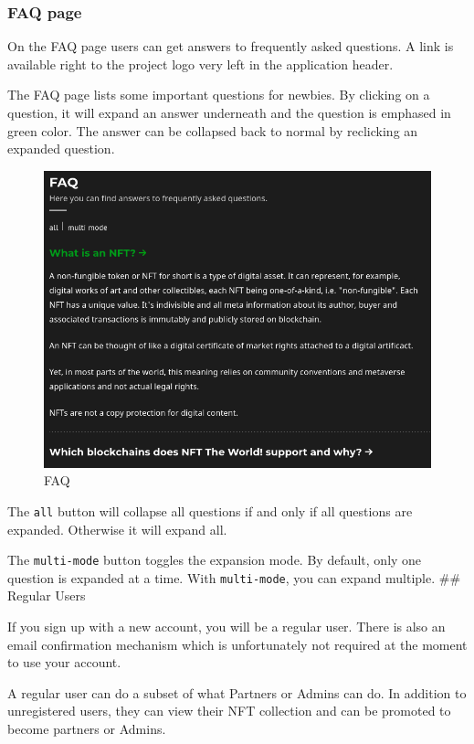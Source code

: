 \documentclass[
]{article}
\begin{document}
\hypertarget{faq-page}{%
\subsubsection{FAQ page}\label{faq-page}}

On the FAQ page users can get answers to frequently asked questions. A
link is available right to the project logo very left in the application
header.

The FAQ page lists some important questions for newbies. By clicking on
a question, it will expand an answer underneath and the question is
emphased in green color. The answer can be collapsed back to normal by
reclicking an expanded question.

\begin{figure}
\centering
\includegraphics{images/faq.png}
\caption{FAQ}
\end{figure}\newpage

The \texttt{all} button will collapse all questions if and only if all
questions are expanded. Otherwise it will expand all.

The \texttt{multi-mode} button toggles the expansion mode. By default,
only one question is expanded at a time. With \texttt{multi-mode}, you
can expand multiple. \#\# Regular Users

If you sign up with a new account, you will be a regular user. There is
also an email confirmation mechanism which is unfortunately not required
at the moment to use your account.

A regular user can do a subset of what Partners or Admins can do. In
addition to unregistered users, they can view their NFT collection and
can be promoted to become partners or Admins.
\end{document}
